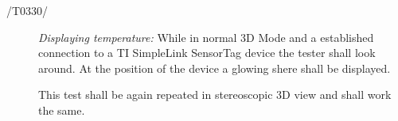 \begin{description}
	\item[/T0330/]
	\textit{Displaying temperature:} While in normal 3D Mode and a established connection to a TI SimpleLink SensorTag device the tester shall look around. At the position of the device a glowing shere shall be displayed.
	
	This test shall be again repeated in stereoscopic 3D view and shall work the same.
\end{description}
